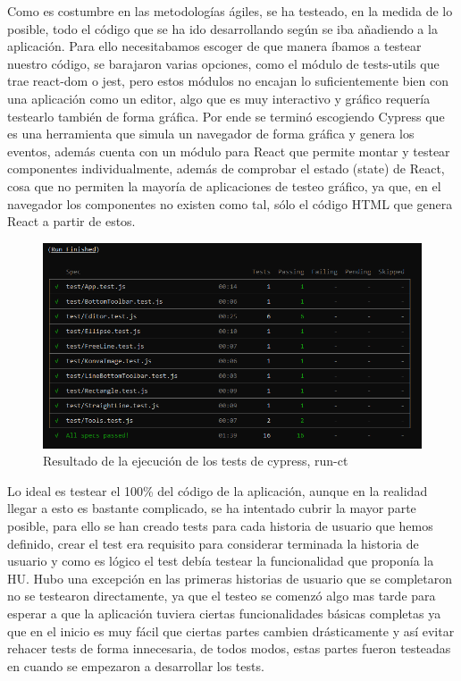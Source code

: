 Como es costumbre en las metodologías ágiles, se ha testeado, en la medida de lo posible,
todo el código que se ha ido desarrollando según se iba añadiendo a la aplicación.
Para ello necesitabamos escoger de que manera íbamos a testear nuestro código, se barajaron
varias opciones, como el módulo de tests-utils que trae react-dom \cite{react-dom} o jest, 
pero estos módulos no encajan lo suficientemente bien con una aplicación como un editor, 
algo que es muy interactivo y gráfico requería testearlo también de forma gráfica. Por ende
se terminó escogiendo Cypress \cite{cypress} que es una herramienta que simula un navegador de
forma gráfica y genera los eventos, además cuenta con un módulo para React \cite{cypressReact} que permite montar
y testear componentes individualmente, además de comprobar el estado (state) de React, cosa
que no permiten la mayoría de aplicaciones de testeo gráfico, ya que, en el navegador los
componentes no existen como tal, sólo el código HTML que genera React a partir de estos.

\begin{figure}[!h]
  \centering
  \includegraphics[scale=0.6]{img/TestsOK.png}
  \caption{Resultado de la ejecución de los tests de cypress, run-ct}
\end{figure}

Lo ideal es testear el 100\% del código de la aplicación, aunque en la realidad llegar a esto
es bastante complicado, se ha intentado cubrir la mayor parte posible, para ello se han creado
tests para cada historia de usuario que hemos definido, crear el test era requisito para considerar
terminada la historia de usuario y como es lógico el test debía testear la funcionalidad que 
proponía la HU. Hubo una excepción en las primeras historias de usuario que se completaron
no se testearon directamente, ya que el testeo se comenzó algo mas tarde para esperar a 
que la aplicación tuviera ciertas funcionalidades básicas completas ya que en el inicio es
muy fácil que ciertas partes cambien drásticamente y así evitar rehacer tests de forma innecesaria,
de todos modos, estas partes fueron testeadas en cuando se empezaron a desarrollar los tests.

